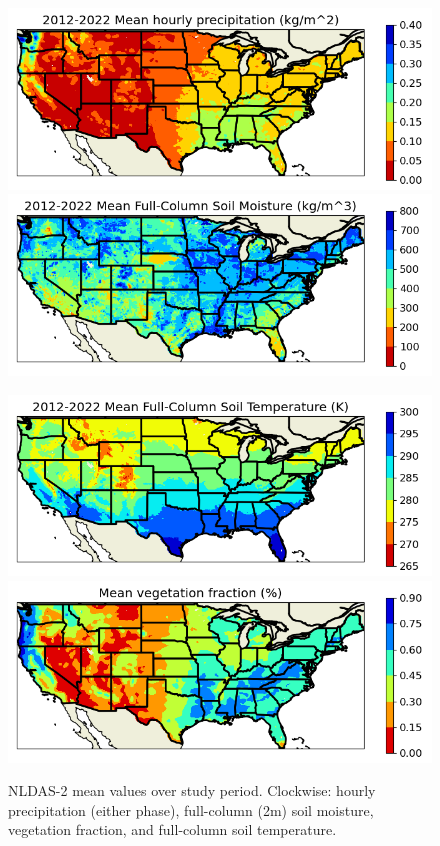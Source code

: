 \documentclass[11pt]{article}
\begin{document}
\begin{figure}[h!]
    \centering

    \includegraphics[width=.48\linewidth]{figs/mean_precip.png}
    \includegraphics[width=.48\linewidth]{figs/mean_soilm_full.png}

    \includegraphics[width=.48\linewidth]{figs/mean_tsoil_full.png}
    \includegraphics[width=.48\linewidth]{figs/mean_vegfrac.png}

    \caption{NLDAS-2 mean values over study period. Clockwise: hourly precipitation (either phase), full-column (2m) soil moisture, vegetation fraction, and full-column soil temperature.}
    \label{mean_samples}
\end{figure}
\end{document}
